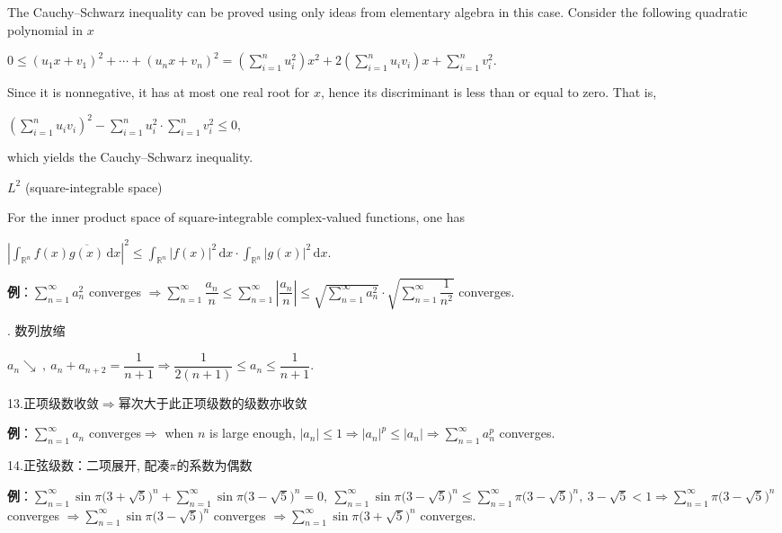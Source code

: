 \documentclass[UTF8]{ctexart}
\numberwithin{equation}{section}
\numberwithin{figure}{section}
\numberwithin{table}{section}
\newcommand\dif{\mathrm{d}}
\newcommand\no{\noindent}
\newcommand\dis{\displaystyle}
\newcommand\ls{\leqslant}
\newcommand\sumn{\dis\sum\limits_{n=1}^{\infty}}
\newcommand\sumin{\dis\sum\limits_{i=1}^{n}}
\begin{document}
\begin{spacing}{2}
The Cauchy–Schwarz inequality can be proved using only ideas from elementary algebra in this case. Consider the following quadratic polynomial in $x$

\centerline{\textcolor[rgb]{0,0,1}{${\displaystyle 0\ls (u_{1}x+v_{1})^{2}+\cdots +(u_{n}x+v_{n})^{2}=\left(\sumin u_{i}^{2}\right)x^{2}+2\left(\sumin u_{i}v_{i}\right)x+\sumin v_{i}^{2}.} $}}

Since it is nonnegative, it has at most one real root for $x$, hence its discriminant is less than or equal to zero. That is,

\centerline{\textcolor[rgb]{0,0,1}{${\displaystyle \left(\sumin u_{i}v_{i}\right)^{2}-\sumin {u_{i}^{2}}\cdot \sumin {v_{i}^{2}}\ls 0,} $}}

which yields the Cauchy–Schwarz inequality.

\textcolor[rgb]{1,0,0}{$L^2$ (square-integrable space)}

For the inner product space of square-integrable complex-valued functions, one has

\centerline{\textcolor[rgb]{0,0,1}{${\displaystyle \left|\int _{\mathbb {R} ^{n}}f(x){\overline {g(x)}}\,\dif x\right|^{2}\ls \int _{\mathbb {R} ^{n}}|f(x)|^{2}\,\dif x\cdot \int _{\mathbb {R} ^{n}}|g(x)|^{2}\,\dif x.} $}}

\vspace{0.3cm}

\textbf{例}：$\sumn a_n^2$ converges $\Longrightarrow\sumn \dfrac{a_n}{n}\ls\sumn \left|\dfrac{a_n}{n}\right|\ls\sqrt{\sumn a_n^2}\cdot\sqrt{\sumn \dfrac{1}{n^2}}$ converges.

\no12. 数列放缩

$a_n\searrow\ ,\ a_n+a_{n+2}=\dfrac{1}{n+1}\Longrightarrow
\dfrac{1}{2(n+1)}\ls a_n\ls\dfrac{1}{n+1}.$

\no13.正项级数收敛$\Longrightarrow$幂次大于此正项级数的级数亦收敛

\textbf{例}：$\sumn a_n$ converges$\Longrightarrow$ when $n$ is large enough, 
$|a_n|\ls1\Longrightarrow|a_n|^p\ls|a_n|\Longrightarrow\sumn a_n^p$ converges.

\vspace{0.2cm}

\no14.正弦级数：二项展开, 配凑$\pi$的系数为偶数

\textbf{例}：$\sumn \sin\pi\Big(3+\sqrt{5}\Big)^n+\sumn \sin\pi\Big(3-\sqrt{5}\Big)^n
=0,\ \sumn \sin\pi\Big(3-\sqrt{5}\Big)^n\ls\sumn \pi\Big(3-\sqrt{5}\Big)^n,\ 3-\sqrt{5}<1\Longrightarrow\sumn \pi\Big(3-\sqrt{5}\Big)^n$ converges $\Longrightarrow\sumn \sin\pi\Big(3-\sqrt{5}\Big)^n$ converges $\Longrightarrow\sumn \sin\pi\Big(3+\sqrt{5}\Big)^n$ converges.


\end{spacing}
\end{document}
